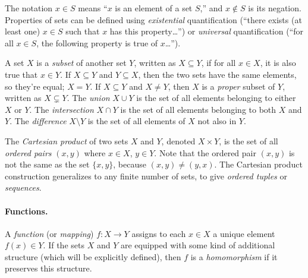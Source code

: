 \documentclass[../generics]{subfiles}
\begin{document}
The notation \index{$\in$}$x\in S$ means ``$x$ is an element of a set $S$,'' and \index{$\notin$}$x\notin S$ is its negation. Properties of sets can be defined using \emph{existential} quantification (``there exists (at least one) $x\in S$ such that $x$ has this property\ldots'') or \emph{universal} quantification (``for all $x\in S$, the following property is true of $x$\ldots'').

%
%
A set $X$ is a \emph{subset} of another set $Y$, written as \index{$\subseteq$}$X\subseteq Y\!$, if for all $x\in X$, it is also true that $x\in Y\!$. If $X\subseteq Y$ and $Y\subseteq X$, then the two sets have the same elements, so they're equal; $X=Y\!$. If $X\subseteq Y$ and $X\neq Y\!$, then $X$ is a \emph{proper} subset of $Y$, written as \index{$\subsetneq$}$X\subsetneq Y\!$. The \emph{union} \index{$\cup$}$X\cup Y$ is the set of all elements belonging to either $X$ or $Y\!$. The \emph{intersection} \index{$\cap$}$X\cap Y$ is the set of all elements belonging to both $X$ and $Y\!$. The \emph{difference} \index{$\setminus$}$X\setminus Y$ is the set of all elements of $X$ not also in $Y\!$.

The \emph{Cartesian product} of two sets $X$ and $Y\!$, denoted \index{$\times$}$X\times Y\!$, is the set of all \emph{ordered pairs} $(x,y)$ where $x\in X$, $y\in Y\!$. Note that the ordered pair $(x,y)$ is not the same as the set $\{x,y\}$, because $(x,y)\neq(y,x)$. The Cartesian product construction generalizes to any finite number of sets, to give \emph{ordered tuples} or \emph{sequences}.

\paragraph{Functions.}
A \emph{function} (or \emph{mapping}) $f\colon X\rightarrow Y$ assigns to each $x\in X$ a unique element $f(x)\in Y$. If the sets $X$ and $Y$ are equipped with some kind of additional structure (which will be explicitly defined), then $f$ is a \emph{homomorphism} if it preserves this structure.
\end{document}
